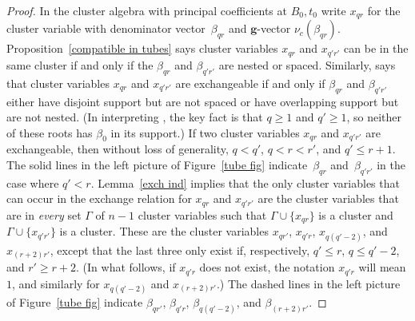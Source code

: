 \documentclass{amsart}
\theoremstyle{definition}
\theoremstyle{remark}
\numberwithin{equation}{section}
\newcommand{\set}[1]{{\lbrace #1 \rbrace}}
\newcommand{\0}{{\mathbf{0}}}
\newcommand{\g}{\mathbf{g}}
\begin{document}
\begin{proof}
In the cluster algebra with principal coefficients at $B_0,t_0$ write $x_{qr}$ for the cluster variable with denominator vector~$\beta_{qr}$ and $\g$-vector $\nu_c(\beta_{qr})$.
Proposition~\ref{compatible in tubes} says cluster variables $x_{qr}$ and $x_{q'r'}$ can be in the same cluster if and only if the $\beta_{qr}$ and $\beta_{q'r'}$ are nested or spaced.
Similarly, \cite[Theorem~7.2]{affdenom} says that cluster variables $x_{qr}$ and $x_{q'r'}$ are exchangeable if and only if $\beta_{qr}$ and $\beta_{q'r'}$ either have disjoint support but are not spaced or have overlapping support but are not nested.
(In interpreting \cite[Theorem~7.2]{affdenom}, the key fact is that $q\ge1$ and $q'\ge 1$, so neither of these roots has $\beta_0$ in its support.)
If two cluster variables $x_{qr}$ and $x_{q'r'}$ are exchangeable, then without loss of generality, $q<q'$, $q<r<r'$, and $q'\le r+1$.
The solid lines in the left picture of Figure~\ref{tube fig} indicate~$\beta_{qr}$ and~$\beta_{q'r'}$ in the case where $q'<r$.
Lemma~\ref{exch ind} implies that the only cluster variables that can occur in the exchange relation for $x_{qr}$ and $x_{q'r'}$ are the cluster variables that are in \emph{every} set $\Gamma$ of $n-1$ cluster variables such that $\Gamma\cup\set{x_{qr}}$ is a cluster and $\Gamma\cup\set{x_{q'r'}}$ is a cluster.
These are the cluster variables $x_{qr'}$, $x_{q'r}$, $x_{q(q'-2)}$, and $x_{(r+2)r'}$, except that the last three only exist if, respectively, $q'\le r$, $q\le q'-2$, and $r'\ge r+2$.
(In what follows, if $x_{q'r}$ does not exist, the notation $x_{q'r}$ will mean $1$, and similarly for $x_{q(q'-2)}$ and $x_{(r+2)r'}$.)
The dashed lines in the left picture of Figure~\ref{tube fig} indicate $\beta_{qr'}$, $\beta_{q'r}$, $\beta_{q(q'-2)}$, and $\beta_{(r+2)r'}$.


\end{proof}
\end{document}
